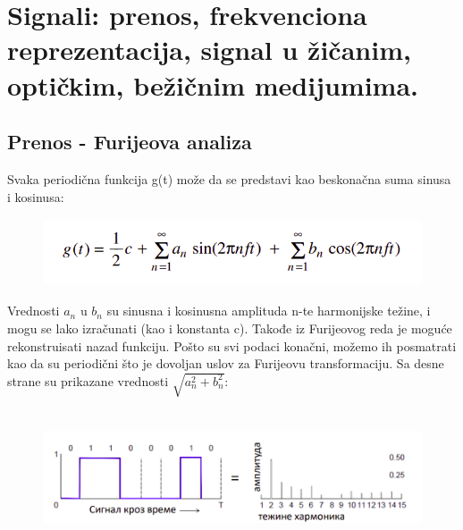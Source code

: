 \documentclass[a4paper]{article}
\begin{document}
\section{Signali: prenos, frekvenciona reprezentacija, signal u žičanim, optičkim, bežičnim medijumima.}
    \subsection{Prenos - Furijeova analiza}
        Svaka periodična funkcija g(t) može da se predstavi kao beskonačna suma sinusa i kosinusa:
        \begin{figure}[H]
            \begin{center}
                \includegraphics[width=125mm,height=20mm]{Slike/furije1.png}
            \end{center}
        \end{figure}
        Vrednosti $a_n$ u $b_n$ su sinusna i kosinusna amplituda n-te harmonijske težine, 
        i mogu se lako izračunati (kao i konstanta c). Takođe iz Furijeovog reda je 
        moguće rekonstruisati nazad funkciju. Pošto su svi podaci konačni, možemo ih 
        posmatrati kao da su periodični što je dovoljan uslov za Furijeovu transformaciju. 
        Sa desne strane su prikazane vrednosti $\sqrt{a_n^2 + b_n^2}$:
        \begin{figure}[H]
            \begin{center}
                \includegraphics[width=125mm,height=40mm]{Slike/furije2.png}
            \end{center}
        \end{figure}
        
\end{document}
